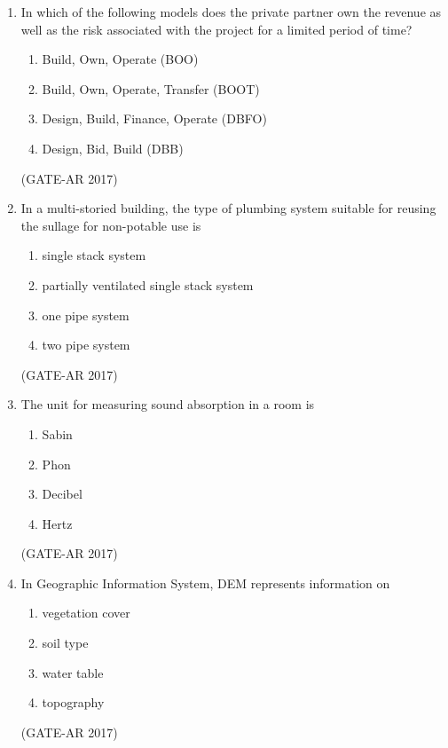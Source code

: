 \documentclass[a4paper,10pt]{article}
\begin{document}
\begin{enumerate}
    \item In which of the following models does the private partner own the revenue as well as the risk associated with the project for a limited period of time? 
    \begin{enumerate}
        \item Build, Own, Operate (BOO)
        \item Build, Own, Operate, Transfer (BOOT)
        \item Design, Build, Finance, Operate (DBFO)
        \item Design, Bid, Build (DBB)
    \end{enumerate}
    \hfill (GATE-AR 2017)

	\item In a multi-storied building, the type of plumbing system suitable for reusing the sullage for non-potable use is 
    \begin{multicols}{2}
	\begin{enumerate}
        \item single stack system
        \item partially ventilated single stack system
        \item one pipe system
        \item two pipe system
    \end{enumerate}
	\end{multicols}
    \hfill (GATE-AR 2017)

	\item The unit for measuring sound absorption in a room is 
    \begin{multicols}{4}
	\begin{enumerate}
        \item Sabin
        \item Phon
        \item Decibel
        \item Hertz
    \end{enumerate}
	\end{multicols}
    \hfill (GATE-AR 2017)

    \item In Geographic Information System, DEM represents information on 
    \begin{multicols}{4}
	\begin{enumerate}
        \item vegetation cover
        \item soil type
        \item water table
        \item topography
    \end{enumerate}
	\end{multicols}
    \hfill (GATE-AR 2017)


\end{enumerate}
\end{document}
